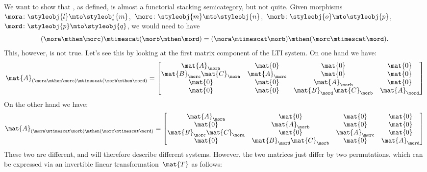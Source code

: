 \begin{example}
    We want to show that \LTI, as defined, is almost a functorial stacking semicategory, but not quite.
    Given morphisms~$\mora\colon \styleobj{l}\mto \styleobj{m}$,~$\morc\colon \styleobj{m}\mto \styleobj{n}$,~$\morb\colon \styleobj{o}\mto \styleobj{p}$,~$\mord\colon \styleobj{p}\mto \styleobj{q}$, we would need to have
    \begin{equation*}
        (\mora \mthen \morc)\mtimescat (\morb\mthen \mord)=(\mora\mtimescat \morb)\mthen (\morc\mtimescat \mord).
    \end{equation*}
    This, however, is not true.
    Let's see this by looking at the first matrix component of the LTI system.
    On one hand we have:
    \begin{equation*}
        \mat{A}_{(\mora \mthen \morc)\mtimescat (\morb\mthen \mord)}=
        \begin{bmatrix}
            \mat{A}_\mora              & \mat{0}       & \mat{0}                    & \mat{0}       \\
            \mat{B}_\morc\mat{C}_\mora & \mat{A}_\morc & \mat{0}                    & \mat{0}       \\
            \mat{0}                    & \mat{0}       & \mat{A}_\morb              & \mat{0}       \\
            \mat{0}                    & \mat{0}       & \mat{B}_\mord\mat{C}_\morb & \mat{A}_\mord
        \end{bmatrix}
    \end{equation*}
    On the other hand we have:
    \begin{equation*}
        \mat{A}_{(\mora\mtimescat \morb)\mthen (\morc\mtimescat \mord)}=
        \begin{bmatrix}
            \mat{A}_\mora               & \mat{0}                     & \mat{0}       & \mat{0}       \\
            \mat{0}                     & \mat{A}_\morb               & \mat{0}       & \mat{0}       \\
            \mat{B}_\morc \mat{C}_\mora & \mat{0}                     & \mat{A}_\morc & \mat{0}       \\
            \mat{0}                     & \mat{B}_\mord \mat{C}_\morb & \mat{0}       & \mat{A}_\mord
        \end{bmatrix}
    \end{equation*}
    These two are different, and will therefore describe different systems.
    However, the two matrices just differ by two permutations, which can be expressed via an invertible linear transformation~$\mat{T}$ as follows:

\end{example}
